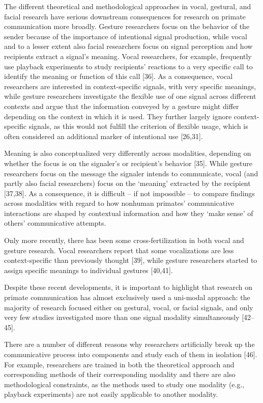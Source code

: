 \documentclass[
  english,
  man,floatsintext]{apa6}
\begin{document}
The different theoretical and methodological approaches in vocal, gestural, and facial research have serious downstream consequences for research on primate communication more broadly. Gesture researchers focus on the behavior of the sender because of the importance of intentional signal production, while vocal and to a lesser extent also facial researchers focus on signal perception and how recipients extract a signal's meaning. Vocal researchers, for example, frequently use playback experiments to study recipients' reactions to a very specific call to identify the meaning or function of this call {[}36{]}. As a consequence, vocal researchers are interested in context-specific signals, with very specific meanings, while gesture researchers investigate the flexible use of one signal across different contexts and argue that the information conveyed by a gesture might differ depending on the context in which it is used. They further largely ignore context-specific signals, as this would not fulfill the criterion of flexible usage, which is often considered an additional marker of intentional use {[}26,31{]}.

Meaning is also conceptualized very differently across modalities, depending on whether the focus is on the signaler's or recipient's behavior {[}35{]}. While gesture researchers focus on the message the signaler intends to communicate, vocal (and partly also facial researchers) focus on the `meaning' extracted by the recipient {[}37,38{]}. As a consequence, it is difficult -- if not impossible -- to compare findings across modalities with regard to how nonhuman primates' communicative interactions are shaped by contextual information and how they `make sense' of others' communicative attempts.

Only more recently, there has been some cross-fertilization in both vocal and gesture research. Vocal researchers report that some vocalizations are less context-specific than previously thought {[}39{]}, while gesture researchers started to assign specific meanings to individual gestures {[}40,41{]}.

Despite these recent developments, it is important to highlight that research on primate communication has almost exclusively used a uni-modal approach: the majority of research focused either on gestural, vocal, or facial signals, and only very few studies investigated more than one signal modality simultaneously {[}42--45{]}.

There are a number of different reasons why researchers artificially break up the communicative process into components and study each of them in isolation {[}46{]}. For example, researchers are trained in both the theoretical approach and corresponding methods of their corresponding modality and there are also methodological constraints, as the methods used to study one modality (e.g., playback experiments) are not easily applicable to another modality.
\end{document}

